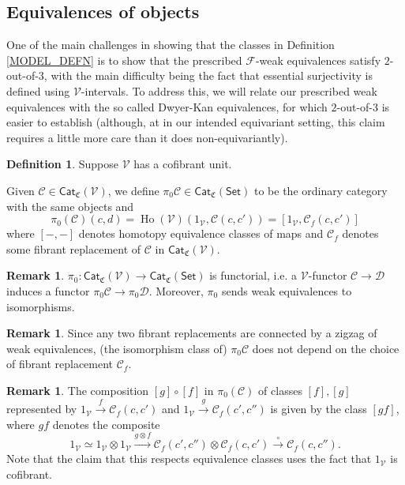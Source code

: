 \documentclass[a4paper,10pt
,draft
]{article}%
\numberwithin{equation}{section}
\numberwithin{figure}{section}
\theoremstyle{definition} %
\newtheorem{definition}[equation]{Definition}%
\newtheorem{remark}[equation]{Remark}%
\newcommand{\Cat}{\mathsf{Cat}}
\DeclareMathOperator{\Ho}{Ho}
\newcommand{\F}{\ensuremath{\mathcal F}}
\newcommand{\V}{\ensuremath{\mathcal V}}
\newcommand{\1}{\ensuremath{\mathbbm 1}}%
\begin{document}
\subsection{Equivalences of objects}

One of the main challenges in showing that the classes in Definition \ref{MODEL_DEFN} is to show that the prescribed 
$\F$-weak equivalences satisfy $2$-out-of-$3$,
with the main difficulty being the fact that essential surjectivity is 
defined using $\V$-intervals.
To address this, we will relate our prescribed weak equivalences
with the so called Dwyer-Kan equivalences,
for which $2$-out-of-$3$ is easier to establish
(although, at in our intended equivariant setting, 
this claim requires a little more care than it does non-equivariantly).



\begin{definition}\label{HTPY_DEFN}
	Suppose $\V$ has a cofibrant unit.

	Given $\mathcal C \in \Cat_{\mathfrak{C}}(\V)$,
	we define $\pi_0 \mathcal C \in \Cat_{\mathfrak{C}}(\mathsf{Set})$ 
	to be the ordinary category with the same objects and
\[
	\pi_0(\mathcal{C})(c,d)=
	\Ho(\V)(1_\V, \mathcal C(c,c'))=
	[1_\V, \mathcal{C}_f(c,c')]
\]
where $[-,-]$ denotes homotopy equivalence classes of maps
and $\mathcal{C}_f$ denotes some fibrant replacement of
$\mathcal C$ in $\Cat_{\mathfrak{C}}(\V)$.
\end{definition}


\begin{remark}
$\pi_0\colon \mathsf{Cat}_{\mathfrak{C}}(\V)
\to \mathsf{Cat}_{\mathfrak{C}}(\mathsf{Set})$ is functorial,
i.e. a $\V$-functor
$\mathcal{C} \to \mathcal{D}$
induces a functor 
$\pi_0\mathcal{C} \to \pi_0\mathcal{D}$.
Moreover, $\pi_0$ sends weak equivalences to isomorphisms.
\end{remark}

\begin{remark}
Since any two fibrant replacements are connected by a zigzag of weak equivalences,
(the isomorphism class of) $\pi_0 \mathcal{C}$ does not depend on the choice of fibrant replacement $\mathcal{C}_f$.
\end{remark}



\begin{remark}
The composition $[g]\circ [f]$
in $\pi_0(\mathcal{C})$
of classes $[f],[g]$
represented by
$1_{\mathcal{V}} \xrightarrow{f} \mathcal{C}_f({c,c'})$
and 
$1_{\mathcal{V}} \xrightarrow{g} \mathcal{C}_f({c',c''})$
is given by the class $[gf]$, where $gf$ denotes the composite
\[
	1_{\mathcal{V}} \simeq
	1_{\mathcal{V}} \otimes 1_{\mathcal{V}} \xrightarrow{g \otimes f}
	\mathcal{C}_f({c',c''}) \otimes  \mathcal{C}_f({c,c'}) \xrightarrow{\circ}
	\mathcal{C}_f({c,c''}).
\]
Note that the claim that this respects equivalence classes uses the fact that $1_{\mathcal{V}}$ is cofibrant.
\end{remark}
\end{document}
